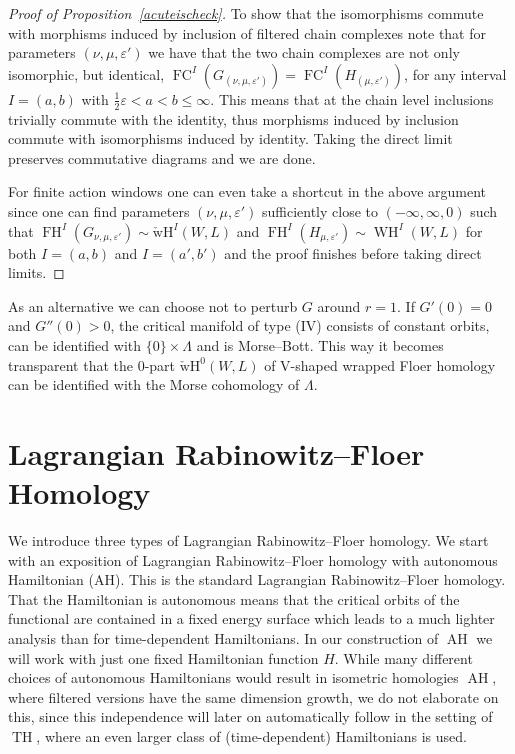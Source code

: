 \documentclass{amsart}
\newcommand{\FH}{\operatorname{FH}}
\newcommand{\FC}{\operatorname{FC}}
\renewcommand{\TH}{\operatorname{TH}}
\newcommand{\AH}{\operatorname{AH}}
\newcommand{\WslantH}{\operatorname{WH}}
\newcommand{\WcheckH}{\operatorname{\check wH}}
\theoremstyle{definition}
\theoremstyle{remark}
\numberwithin{equation}{section}
\begin{document}
\begin{proof}[Proof of Proposition~\ref{acuteischeck}]
To show that the isomorphisms commute with morphisms induced by inclusion of filtered chain complexes note that for parameters $(\nu,\mu,\varepsilon')$ we have that the two chain complexes are not only isomorphic, but identical, $\FC^I(G_{(\nu,\mu,\varepsilon')})=\FC^I(H_{(\mu,\varepsilon')})$, for any interval $I=(a,b)$ with $\frac12\varepsilon<a<b\leq \infty$. This means that at the chain level inclusions trivially commute with the identity, thus morphisms induced by inclusion commute with isomorphisms induced by identity. Taking the direct limit preserves commutative diagrams and we are done.

For finite action windows one can even take a shortcut in the above argument since one can find parameters $(\nu,\mu,\varepsilon')$ sufficiently close to $(-\infty,\infty,0)$ such that $\FH^I(G_{\nu,\mu,\varepsilon'})\sim\WcheckH^I(W,L)$ and $\FH^I(H_{\mu,\varepsilon'})\sim\WslantH^I(W,L)$ for both $I=(a,b)$ and $I=(a',b')$ and the proof finishes before taking direct limits.
\end{proof}

As an alternative we can choose not to perturb $G$ around $r=1$. If $G'(0)=0$ and $G''(0)>0$, the critical manifold of type (IV) consists of constant orbits, can be identified with $\{0\}\times\Lambda$ and is Morse--Bott. This way it becomes transparent that the 0-part $\WcheckH^0(W,L)$ of V-shaped wrapped Floer homology can be identified with the Morse cohomology of $\Lambda$. 

\section{Lagrangian Rabinowitz--Floer Homology}\label{sec:lrfh}

We introduce three types of Lagrangian Rabinowitz--Floer homology. We start with an exposition of Lagrangian Rabinowitz--Floer homology with autonomous Hamiltonian (AH). This is the standard Lagrangian Rabinowitz--Floer homology. That the Hamiltonian is autonomous means that the critical orbits of the functional are contained in a fixed energy surface which leads to a much lighter analysis than for time-dependent Hamiltonians. In our construction of $\AH$ we will work with just one fixed Hamiltonian function $H$. While many different choices of autonomous Hamiltonians would result in isometric homologies $\AH$, where filtered versions have the same dimension growth, we do not elaborate on this, since this independence will later on automatically follow in the setting of $\TH$, where an even larger class of (time-dependent) Hamiltonians is used.
\end{document}
